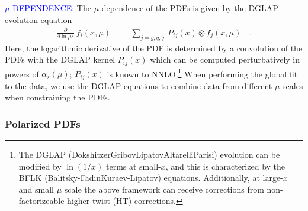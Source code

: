 \textcolor{blue}{$\mu$-DEPENDENCE:} 
The $\mu$-dependence of the
PDFs is given by the DGLAP evolution equation\cite{Dokshitzer:1977sg,Gribov:1972ri,Altarelli:1977zs}
\begin{eqnarray*}
\frac{\partial}{\partial\ln\mu^{2}}\:f_{i}(x,\mu) & = & \sum_{j=g,q,\bar{q}}\ P_{ij}(x)\otimes f_{j}(x,\mu)\quad.
\end{eqnarray*}
Here, the logarithmic derivative of the PDF is determined by a convolution
of the PDFs with the DGLAP kernel $P_{ij}(x)$ which can be computed
perturbatively in powers of $\alpha_{s}(\mu)$; $P_{ij}(x)$ is known
to NNLO.\footnote{The DGLAP (Dokshitzer\textendash Gribov\textendash Lipatov\textendash Altarelli\textendash Parisi)
evolution can be modified by $\ln(1/x)$ terms at small-$x$, and
this is characterized by the BFLK (Balitsky-FadinKuraev-Lipatov) equations.\cite{Kuraev:1976ge,Kuraev:1977fs,Balitsky:1978ic}
Additionally, at large-$x$ and small $\mu$ scale the above framework
can receive corrections from non-factorizeable higher-twist (HT) corrections.} When performing the global fit to the data, we use the DGLAP equations
to combine data from different $\mu$ scales when constraining the
PDFs. 




\subsubsection{Polarized PDFs}
